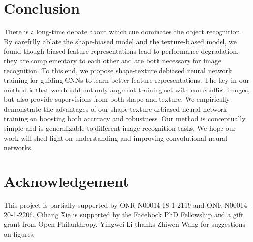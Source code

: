\documentclass{article} \usepackage{iclr2021_conference,times}
\begin{document}
\section{Conclusion}
There is a long-time debate about which cue dominates the object recognition. By carefully ablate the shape-biased model and the texture-biased model, we found though biased feature representations lead to performance degradation, they are complementary to each other and are both necessary for image recognition.
To this end, we propose shape-texture debiased neural network training for guiding CNNs to learn better feature representations. The key in our method is that we should not only augment training set with cue conflict images, but also provide supervisions from both shape and texture. 
We empirically demonstrate the advantages of our shape-texture debiased neural network training on boosting both accuracy and robustness. Our method is conceptually simple and is generalizable to different image recognition tasks. We hope our work will shed light on understanding and improving convolutional neural networks.

\section*{Acknowledgement}
This project is partially supported by ONR N00014-18-1-2119 and ONR N00014-20-1-2206. Cihang Xie is supported by the Facebook PhD Fellowship and a gift grant from Open Philanthropy. Yingwei Li thanks Zhiwen Wang for suggestions on figures.




\newpage
\end{document}
